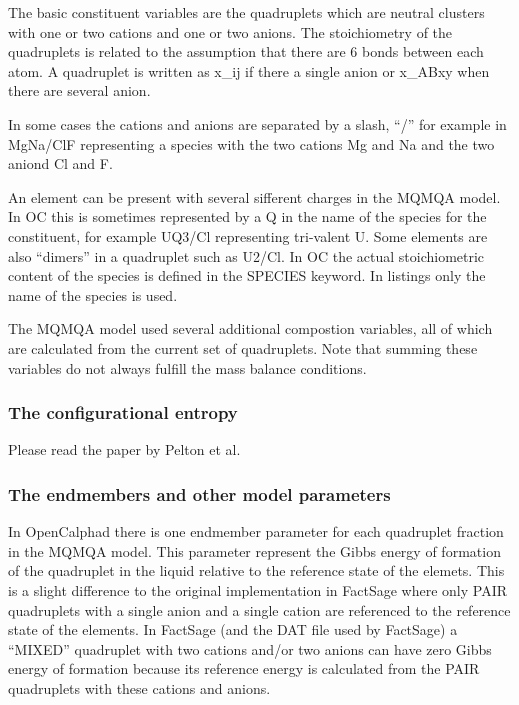 \documentclass[11pt]{article}
\begin{document}
The basic constituent variables are the quadruplets which are neutral
clusters with one or two cations and one or two anions.  The
stoichiometry of the quadruplets is related to the assumption that
there are 6 bonds between each atom.  A quadruplet is written
as x\_ij if there a single anion or x\_ABxy when there are several
anion.

In some cases the cations and anions are separated by a slash, ``/''
for example in MgNa/ClF representing a species with the two cations Mg
and Na and the two aniond Cl and F.

An element can be present with several sifferent charges in the MQMQA
model.  In OC this is sometimes represented by a Q in the name of the
species for the constituent, for example UQ3/Cl representing
tri-valent U.  Some elements are also ``dimers'' in a quadruplet such
as U2/Cl.  In OC the actual stoichiometric content of the species is
defined in the SPECIES keyword.  In listings only the name of the
species is used.

The MQMQA model used several additional compostion variables, all of
which are calculated from the current set of quadruplets.  Note that
summing these variables do not always fulfill the mass balance
conditions.

\subsubsection{The configurational entropy}\label{sc:quasichemical_entropy}

Please read the paper by Pelton et al.

\hypertarget{Info MQMQA param}{}
\subsubsection{The endmembers and other model parameters}\label{sc:mqmqa_params}

In OpenCalphad there is one endmember parameter for each quadruplet
fraction in the MQMQA model.  This parameter represent the Gibbs
energy of formation of the quadruplet in the liquid relative to the
reference state of the elemets.  This is a slight difference to the
original implementation in FactSage where only PAIR quadruplets with a
single anion and a single cation are referenced to the reference state
of the elements.  In FactSage (and the DAT file used by FactSage) a
``MIXED'' quadruplet with two cations and/or two anions can have zero
Gibbs energy of formation because its reference energy is calculated
from the PAIR quadruplets with these cations and anions.
\end{document}
